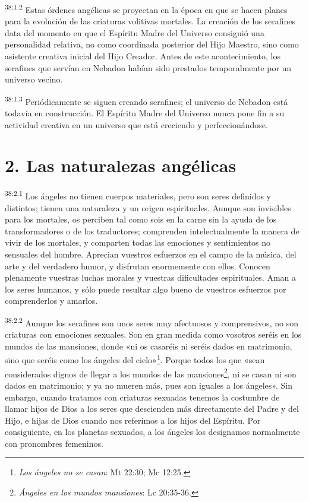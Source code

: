 \par
\textsuperscript{38:1.2} Estas órdenes angélicas se proyectan en la época en que se hacen planes para la evolución de las criaturas volitivas mortales. La creación de los serafines data del momento en que el Espíritu Madre del Universo consiguió una personalidad relativa, no como coordinada posterior del Hijo Maestro, sino como asistente creativa inicial del Hijo Creador. Antes de este acontecimiento, los serafines que servían en Nebadon habían sido prestados temporalmente por un universo vecino.

\par
\textsuperscript{38:1.3} Periódicamente se siguen creando serafines; el universo de Nebadon está todavía en construcción. El Espíritu Madre del Universo nunca pone fin a su actividad creativa en un universo que está creciendo y perfeccionándose.

\section*{2. Las naturalezas angélicas}
\par
\textsuperscript{38:2.1} Los ángeles no tienen cuerpos materiales, pero son seres definidos y distintos; tienen una naturaleza y un origen espirituales. Aunque son invisibles para los mortales, os perciben tal como sois en la carne sin la ayuda de los transformadores o de los traductores; comprenden intelectualmente la manera de vivir de los mortales, y comparten todas las emociones y sentimientos no sensuales del hombre. Aprecian vuestros esfuerzos en el campo de la música, del arte y del verdadero humor, y disfrutan enormemente con ellos. Conocen plenamente vuestras luchas morales y vuestras dificultades espirituales. Aman a los seres humanos, y sólo puede resultar algo bueno de vuestros esfuerzos por comprenderlos y amarlos.

\par
\textsuperscript{38:2.2} Aunque los serafines son unos seres muy afectuosos y comprensivos, no son criaturas con emociones sexuales. Son en gran medida como vosotros seréis en los mundos de las mansiones, donde «ni os casaréis ni seréis dados en matrimonio, sino que seréis como los ángeles del cielo»\footnote{\textit{Los ángeles no se casan}: Mt 22:30; Mc 12:25.}. Porque todos los que «sean considerados dignos de llegar a los mundos de las mansiones\footnote{\textit{Ángeles en los mundos mansiones}: Lc 20:35-36.}, ni se casan ni son dados en matrimonio; y ya no mueren más, pues son iguales a los ángeles». Sin embargo, cuando tratamos con criaturas sexuadas tenemos la costumbre de llamar hijos de Dios a los seres que descienden más directamente del Padre y del Hijo, e hijas de Dios cuando nos referimos a los hijos del Espíritu. Por consiguiente, en los planetas sexuados, a los ángeles los designamos normalmente con pronombres femeninos.

